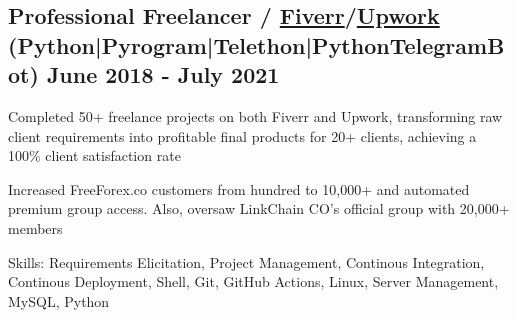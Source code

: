 \subsection{{Professional Freelancer / \href{https://www.fiverr.com/users/takausrazeem}{Fiverr}/\href{https://www.upwork.com/freelancers/~018bcc7acbf1d3e149}{Upwork} (Python|Pyrogram|Telethon|PythonTelegramBot) \hfill June 2018 - July 2021}}
\begin{zitemize}
\setlength\itemsep{0.5em}

\item Completed 50+ freelance projects on both Fiverr and Upwork, transforming raw client requirements into profitable final products for 20+ clients, achieving a 100\% client satisfaction rate

\item Increased FreeForex.co customers from hundred to 10,000+ and automated premium group access. Also, oversaw LinkChain CO's official group with 20,000+ members

\item[] Skills: Requirements Elicitation, Project Management, Continous Integration, Continous Deployment, Shell, Git, GitHub Actions, Linux, Server Management, MySQL, Python

\end{zitemize}

